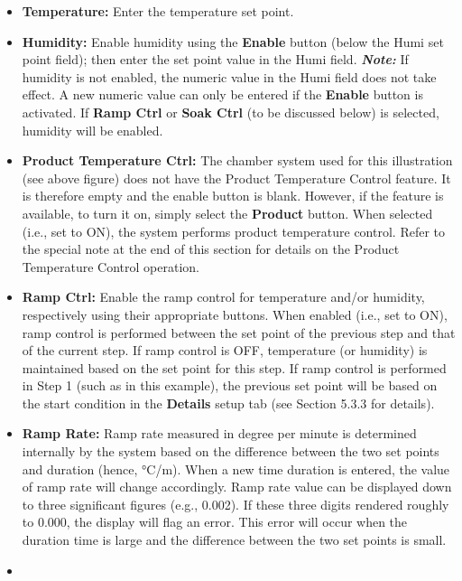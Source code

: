 \begin{enumerate}
  \begin{itemize}
  \tightlist
  \item
    \textbf{Temperature:} Enter the temperature set point.
  \item
    \textbf{Humidity:} Enable humidity using the \textbf{Enable} button
    (below the Humi set point field); then enter the set point value in
    the Humi field. \textbf{\emph{Note:}} If humidity is not enabled,
    the numeric value in the Humi field does not take effect. A new
    numeric value can only be entered if the \textbf{Enable} button is
    activated. If \textbf{Ramp Ctrl} or \textbf{Soak Ctrl} (to be
    discussed below) is selected, humidity will be enabled.
  \item
    \textbf{Product Temperature Ctrl:} The chamber system used for this
    illustration (see above figure) does not have the Product
    Temperature Control feature. It is therefore empty and the enable
    button is blank. However, if the feature is available, to turn it
    on, simply select the \textbf{Product} button. When selected (i.e.,
    set to ON), the system performs product temperature control. Refer
    to the special note at the end of this section for details on the
    Product Temperature Control operation.\\
  \item
    \textbf{Ramp Ctrl:} Enable the ramp control for temperature and/or
    humidity, respectively using their appropriate buttons. When enabled
    (i.e., set to ON), ramp control is performed between the set point
    of the previous step and that of the current step. If ramp control
    is OFF, temperature (or humidity) is maintained based on the set
    point for this step. If ramp control is performed in Step 1 (such as
    in this example), the previous set point will be based on the start
    condition in the \textbf{Details} setup tab (see Section 5.3.3 for
    details).
  \item
    \textbf{Ramp Rate:} Ramp rate measured in degree per minute is
    determined internally by the system based on the difference between
    the two set points and duration (hence, °C/m). When a new time
    duration is entered, the value of ramp rate will change accordingly.
    Ramp rate value can be displayed down to three significant figures
    (e.g., 0.002). If these three digits rendered roughly to 0.000, the
    display will flag an error. This error will occur when the duration
    time is large and the difference between the two set points is
    small.
  \item

\end{itemize}
\end{enumerate}
